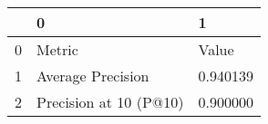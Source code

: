 \begin{tabular}{lll}
\toprule
 & 0 & 1 \\
\midrule
0 & Metric & Value \\
1 & Average Precision & 0.940139 \\
2 & Precision at 10 (P@10) & 0.900000 \\
\bottomrule
\end{tabular}

